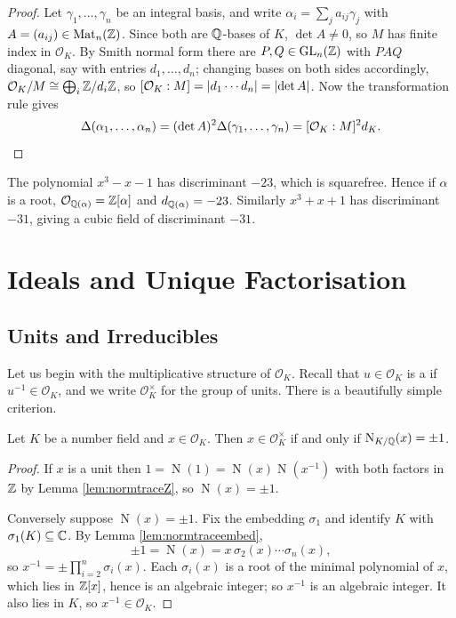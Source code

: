 \documentclass[a4paper]{scrartcl}
\renewcommand{\OO}{\mathcal{O}}
\newcommand{\Nm}{\operatorname{N}}
\begin{document}
\begin{proof}
	Let $\gamma_1, \dots, \gamma_n$ be an integral basis, and write $\alpha_i = \sum_j a_{ij}\gamma_j$ with $A = (a_{ij}) \in \mathrm{Mat}_n(\mathbb{Z})$. Since both are $\mathbb{Q}$-bases of $K$, $\det A \neq 0$, so $M$ has finite index in $\OO_K$. By Smith normal form there are $P, Q \in \operatorname{GL}_n(\mathbb{Z})$ with $PAQ$ diagonal, say with entries $d_1, \dots, d_n$; changing bases on both sides accordingly, $\OO_K/M \cong \bigoplus_i \Z/d_i\Z$, so $[\OO_K:M] = \abs{d_1\cdots d_n} = \abs{\det A}$. Now the transformation rule gives
	$$\Delta(\alpha_1,\dots,\alpha_n) = (\det A)^2\Delta(\gamma_1,\dots,\gamma_n) = [\OO_K:M]^2 d_K. \qedhere$$
\end{proof}

\begin{example}
	The polynomial $x^3 - x - 1$ has discriminant $-23$, which is squarefree. Hence if $\alpha$ is a root, $\OO_{\Q(\alpha)} = \Z[\alpha]$ and $d_{\mathbb{Q}(\alpha)} = -23$. Similarly $x^3 + x + 1$ has discriminant $-31$, giving a cubic field of discriminant $-31$.
\end{example}

\section{Ideals and Unique Factorisation}\label{sec:ideals}

\subsection{Units and Irreducibles}

Let us begin with the multiplicative structure of $\OO_K$. Recall that $u \in \OO_K$ is a  if $u^{-1} \in \OO_K$, and we write $\OO_K^\times$ for the group of units. There is a beautifully simple criterion.

\begin{lemma}\label{lem:unitnorm}
	Let $K$ be a number field and $x \in \OO_K$. Then $x \in \OO_K^\times$ if and only if $\Nm_{K/\Q}(x) = \pm 1$.
\end{lemma}

\begin{proof}
	If $x$ is a unit then $1 = \Nm(1) = \Nm(x)\Nm(x^{-1})$ with both factors in $\mathbb{Z}$ by Lemma \ref{lem:normtraceZ}, so $\Nm(x) = \pm 1$.

	Conversely suppose $\Nm(x) = \pm1$. Fix the embedding $\sigma_1$ and identify $K$ with $\sigma_1(K) \subseteq \mathbb{C}$. By Lemma \ref{lem:normtraceembed},
	$$\pm 1 = \Nm(x) = x\,\sigma_2(x)\cdots\sigma_n(x),$$
	so $x^{-1} = \pm\prod_{i=2}^n\sigma_i(x)$. Each $\sigma_i(x)$ is a root of the minimal polynomial of $x$, which lies in $\mathbb{Z}[x]$, hence is an algebraic integer; so $x^{-1}$ is an algebraic integer. It also lies in $K$, so $x^{-1} \in \OO_K$.
\end{proof}
\end{document}
